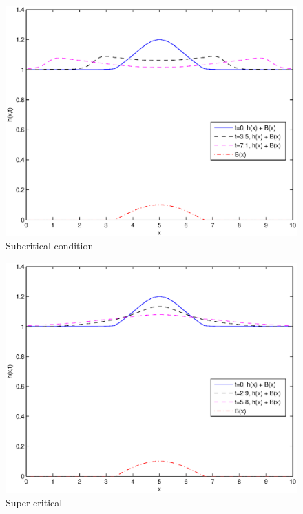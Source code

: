 \begin{figure}
	[htbp] \centering 
	\includegraphics[width=\MyWidth]{Figures/critical_c2817_p1_n_is_80_a_0.eps} \caption{Subcritical condition} \label{fig:Figures_critical_c2817_p1_n_is_80_a_0} 
\end{figure}

\begin{figure}
	[htbp] \centering 
	\includegraphics[width=\MyWidth]{Figures/critical_c3444_p1_n_is_80_a_0.eps} \caption{Super-critical} \label{fig:Figures_critical_c3444_p1_n_is_80_a_0} 
\end{figure}

